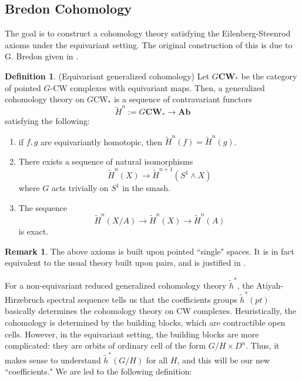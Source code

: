 \documentclass{article}
\theoremstyle{definition}
\newtheorem{definition}[theorem]{Definition}
\newtheorem{remark}[theorem]{Remark}
\begin{document}
\subsection{Bredon Cohomology}  
The goal is to construct a cohomology theory satisfying the Eilenberg-Steenrod axioms under the equivariant setting. The original construction of this is due to G. Bredon given in \cite{Bredon}.
 \begin{tcolorbox}[colback=purple!5!white,colframe=purple!75!black]
 \begin{definition}
 (Equivariant generalized cohomology) Let $G\textbf{CW}_*$ be the category of pointed $G$-CW complexes with equivariant maps. Then, a generalized cohomology theory on $G\textrm{CW}_*$ is a sequence of contravariant functors 
 \[\tilde{H}^n:=G\textbf{CW}_*\to \textbf{Ab} \]
 satisfying the following:
 \begin{enumerate}
    \item if $f,g$ are equivariantly homotopic, then $\tilde{H}^n(f)=\tilde{H}^n(g)$.
    \item There exists a sequence of natural isomorphisms
   \[\tilde{H}^n(X)\to \tilde{H}^{n+1}(S^1\wedge X)\]
   where $G$ acts trivially on $S^1$ in the smash. 
    \item The sequence 
    \[\tilde{H}^n(X/A)\to \tilde{H}^n(X)\to \tilde{H}^n(A)\]
    is exact.
 \end{enumerate}
 \end{definition}
 \end{tcolorbox}

\begin{tcolorbox}[colback=green!5!white,colframe=green!30!white]
\begin{remark}
The above axioms is built upon pointed ``single" spaces. It is in fact equivalent to the usual theory built upon pairs, and is justified in \cite{WH}.
\end{remark}
\end{tcolorbox}
For a non-equivariant reduced generalized cohomology theory $\tilde{h}^*$, the Atiyah-Hirzebruch spectral sequence tells us that the coefficients groups $\tilde{h}^*(pt)$ basically determines the cohomology theory on CW complexes. Heuristically, the cohomology is determined by the building blocks, which are contractible open cells. However, in the equivariant setting, the building blocks are more complicated: they are orbits of ordinary cell of the form $G/H\times D^n$. Thus, it makes sense to understand $\tilde{h}^*(G/H)$ for all $H$, and this will be our new ``coefficients." We are led to the following definition:
\end{document}
